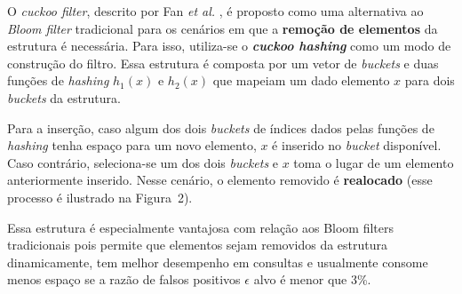 \documentclass[portrait]{ppgcaposter}
\begin{document}
\begin{multicols}{2}
O \textit{cuckoo filter}, descrito por Fan \textit{et al.} \cite{cuckoo}, é proposto como uma alternativa ao \textit{Bloom filter} tradicional para os cenários em que a \textbf{remoção de elementos} da estrutura é necessária. Para isso, utiliza-se o \textbf{\textit{cuckoo hashing}} como um modo de construção do filtro. Essa estrutura é composta por um vetor de \textit{buckets} e duas funções de \textit{hashing} $h_1(x)$ e $h_2(x)$ que mapeiam um dado elemento $x$ para dois \textit{buckets} da estrutura.

Para a inserção, caso algum dos dois \textit{buckets} de índices dados pelas funções de \textit{hashing} tenha espaço para um novo elemento, $x$ é inserido no \textit{bucket} disponível. Caso contrário, seleciona-se um dos dois \textit{buckets} e $x$ toma o lugar de um elemento anteriormente inserido. Nesse cenário, o elemento removido é \textbf{realocado} (esse processo é ilustrado na Figura~2).

Essa estrutura é especialmente vantajosa com relação aos Bloom filters tradicionais pois permite que elementos sejam removidos da estrutura dinamicamente, tem melhor desempenho em consultas e usualmente consome menos espaço se a razão de falsos positivos $\epsilon$ alvo é menor que 3\%.

\begin{center}\vspace{1cm}
\end{center}
\end{multicols}
\end{document}
